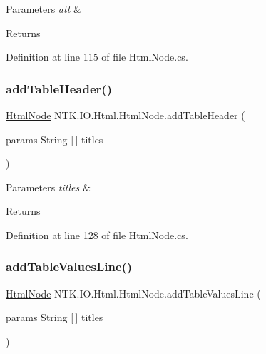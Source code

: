 \begin{DoxyParams}{Parameters}
{\em att} & \\
\hline
\end{DoxyParams}
\begin{DoxyReturn}{Returns}

\end{DoxyReturn}


Definition at line 115 of file Html\+Node.\+cs.

\mbox{\label{class_n_t_k_1_1_i_o_1_1_html_1_1_html_node_af37ec1d025a6094368faa24258e2b361}} 
\subsubsection{\texorpdfstring{addTableHeader()}{addTableHeader()}}
{\footnotesize\ttfamily \mbox{\hyperlink{class_n_t_k_1_1_i_o_1_1_html_1_1_html_node}{Html\+Node}} N\+T\+K.\+I\+O.\+Html.\+Html\+Node.\+add\+Table\+Header (\begin{DoxyParamCaption}\item[{params String \mbox{[}$\,$\mbox{]}}]{titles }\end{DoxyParamCaption})}






\begin{DoxyParams}{Parameters}
{\em titles} & \\
\hline
\end{DoxyParams}
\begin{DoxyReturn}{Returns}

\end{DoxyReturn}


Definition at line 128 of file Html\+Node.\+cs.

\mbox{\label{class_n_t_k_1_1_i_o_1_1_html_1_1_html_node_a6ada68a8305622cab2fe9fd391f44ddf}} 
\subsubsection{\texorpdfstring{addTableValuesLine()}{addTableValuesLine()}}
{\footnotesize\ttfamily \mbox{\hyperlink{class_n_t_k_1_1_i_o_1_1_html_1_1_html_node}{Html\+Node}} N\+T\+K.\+I\+O.\+Html.\+Html\+Node.\+add\+Table\+Values\+Line (\begin{DoxyParamCaption}\item[{params String \mbox{[}$\,$\mbox{]}}]{titles }\end{DoxyParamCaption})}






